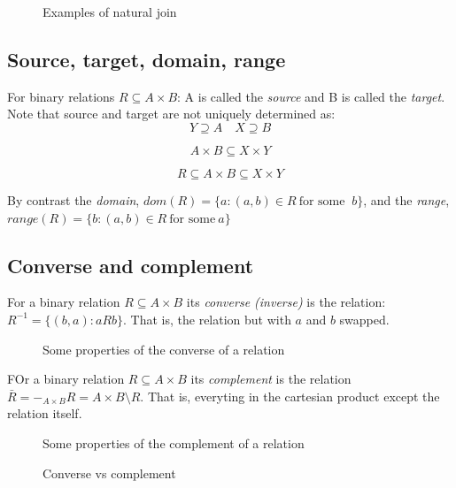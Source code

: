 \documentclass[12pt]{article} %
\begin{document}
\begin{figure}[H]
\caption{Examples of natural join}
\label{Natural join example}
\end{figure}

\subsection{Source, target, domain, range}
For binary relations $R \subseteq A \times B$: A is called the \textit{source} and B is called the \textit{target}. Note that source and target are not uniquely determined as:
\[
    Y \supseteq A \quad X \supseteq B
\]

\[
    A \times B \subseteq X \times Y 
\]

\[
    R \subseteq A \times B \subseteq X \times Y
\]

By contrast the \textit{domain}, $dom(R) = \{a : (a,b) \in R \ \textrm{for some } \ b\}$, and the \textit{range}, $range(R) = \{b : (a,b) \in R \ \textrm{for some} \ a\}$


\subsection{Converse and complement}
For a binary relation $R \subseteq A \times B$ its \textit{converse (inverse)} is the relation: $R^{-1} = \{(b,a) : aRb\}$. That is, the relation but with $a$ and $b$ swapped.

\begin{figure}[H]
\caption{Some properties of the converse of a relation}
\label{Converse properties}
\end{figure}

FOr a binary relation $R \subseteq A \times B$ its \textit{complement} is the relation $\bar{R} = -_{A \times B}R = A \times B \setminus R$. That is, everyting in the cartesian product except the relation itself.

\begin{figure}[H]
\caption{Some properties of the complement of a relation}
\label{Conplement properties}
\end{figure}

\begin{figure}[H]
\caption{Converse vs complement}
\label{Converse vs complement}
\end{figure}
\end{document}
